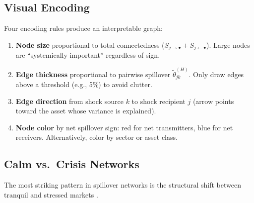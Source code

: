 \subsection{Visual Encoding}

Four encoding rules produce an interpretable graph:
\begin{enumerate}[nosep]
  \item \textbf{Node size} proportional to total connectedness
        ($S_{j \rightarrow \bullet} + S_{j \leftarrow \bullet}$).
        Large nodes are ``systemically important'' regardless of sign.
  \item \textbf{Edge thickness} proportional to pairwise spillover
        $\widetilde{\theta}_{jk}^{(H)}$.  Only draw edges above a threshold
        (e.g., 5\%) to avoid clutter.
  \item \textbf{Edge direction} from shock source $k$ to shock recipient $j$
        (arrow points toward the asset whose variance is explained).
  \item \textbf{Node color} by net spillover sign: red for net transmitters,
        blue for net receivers.  Alternatively, color by sector or asset class.
\end{enumerate}

\subsection{Calm vs.\ Crisis Networks}

The most striking pattern in spillover networks is the structural shift between
tranquil and stressed markets \citep{DemirerDieboldLiuYilmaz2018}.

